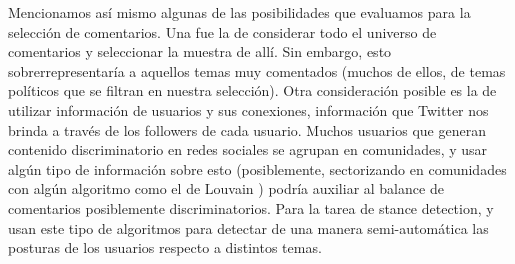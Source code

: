 Mencionamos así mismo algunas de las posibilidades que evaluamos para la selección de comentarios. Una fue la de considerar todo el universo de comentarios y seleccionar la muestra de allí. Sin embargo, esto sobrerrepresentaría a aquellos temas muy comentados (muchos de ellos, de temas políticos que se filtran en nuestra selección). Otra consideración posible es la de utilizar información de usuarios y sus conexiones, información que Twitter nos brinda a través de los followers de cada usuario. Muchos usuarios que generan contenido discriminatorio en redes sociales se agrupan en comunidades, y usar algún tipo de información sobre esto (posiblemente, sectorizando en comunidades con algún algoritmo como el de Louvain \cite{blondel2008fast}) podría auxiliar al balance de comentarios posiblemente discriminatorios. Para la tarea de stance detection, \citet{lai2018stance} y \citet{furman2021you} usan este tipo de algoritmos para detectar de una manera semi-automática las posturas de los usuarios respecto a distintos temas.

